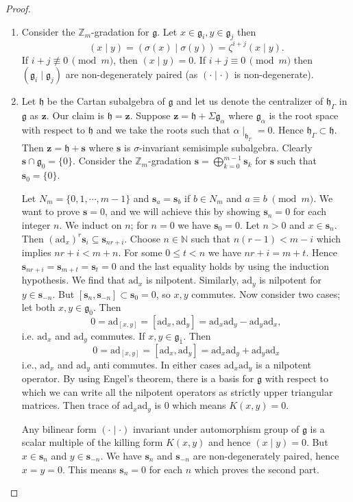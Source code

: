 \documentclass[11pt]{amsart}
\theoremstyle{plain}
\theoremstyle{definition}
\newcommand{\g}{\mathfrak{g}}
\newcommand{\h}{\mathfrak{h}}
\begin{document}
\begin{proof}
\begin{enumerate}[label=(\alph*)]
\item 
Consider the $\mathbb{Z}_{m}$-gradation for $\g$. Let  $x\in\g_{i}, y \in \g_{j}$ then 
 \[(x \mid y)=(\sigma(x) \mid \sigma(y))=\zeta^{i+j}(x \mid y).\]
 If $i+j \not\equiv 0\, {\pmod m}$, then $(x \mid y)=0$. If $i+j \equiv 0\, {\pmod m}$ then $(\g_{i} \mid \g_{j})$ are non-degenerately paired
 (as $(\cdot \mid \cdot)$ is non-degenerate).
 \item
Let $\h$ be the Cartan subalgebra of $\g$ and let us denote the centralizer of $\h_{\Gamma}$ in $\g$ as $\textbf{z}$. Our claim is $\h=\textbf{z}.$ Suppose $\textbf{z}=\h +\Sigma \g_{\alpha}$ where $\g_{\alpha}$ is the root space with respect to $\h$ and we take the roots such that $\alpha \mid_{\h_{\Gamma}}=0$. Hence $\h_{\Gamma} \subset \h$. Then $\textbf{z}=\h + \textbf{s}$ where $\textbf{s}$ is $\sigma$-invariant semisimple subalgebra. Clearly $\textbf{s} \cap \g_{0}=\{0\}$. Consider the $\mathbb{Z}_{m}$-gradation  $ \textbf{s}=\bigoplus_{k=0}^{m-1}\textbf{s}_{k}$ for $\textbf{s}$ such that $\textbf{s}_{0}=\{0\}$.

Let $N_{m}=\{0, 1, \cdots, m-1\}$ and $\textbf{s}_{a}=\textbf{s}_{b}$ if $b \in N_{m}$ and $a \equiv b\; {\pmod m}$. We want to prove $\textbf{s}=0$, and we will achieve this by showing $\textbf{s}_{n}=0$ for each integer $n$. We induct on $n$; for $n=0$ we have $\textbf{s}_{0}=0$. Let $n>0$ and $x \in \textbf{s}_{n}$. Then $(\mathrm{ad}_x)^{r} \textbf{s}_{i} \subseteq \textbf{s}_{nr+i}$. Choose $n \in \mathbb{N}$ such that $n(r-1) < m-i$ which implies $n r+i < m+n$. For some $0 \leq t <n$ we have $n r+i=m+t$. Hence $\textbf{s}_{n r+i}=\textbf{s}_{m+t}=\textbf{s}_{t}=0$ and the last equality holds by using the induction hypothesis. We find that $\mathrm{ad}_{x}$ is nilpotent. Similarly, $\mathrm{ad}_{y}$ is nilpotent for $y \in \textbf{s}_{-n}.$ But $[\textbf{s}_{n}, \textbf{s}_{-n}]\subset \textbf{s}_{0}=0$, so $x, y$ commutes. Now consider two cases; let both $x, y \in \g_{\bar{0}}$. Then \[0=\mathrm{ad}_{[x, y]}=[\mathrm{ad}_{x}, \mathrm{ad}_{y}]=\mathrm{ad}_{x} \mathrm{ad}_{y}-\mathrm{ad}_{y} \mathrm{ad}_{x},\] i.e. $\mathrm{ad}_{x}$ and $\mathrm{ad}_{y}$ commutes. If  $x, y \in \g_{\bar{1}}$. Then
\[ 0=\mathrm{ad}_{[x, y]}=[\mathrm{ad}_{x}, \mathrm{ad}_{y}]=\mathrm{ad}_{x} \mathrm{ad}_{y}+\mathrm{ad}_{y} \mathrm{ad}_{x}\] i.e., $\mathrm{ad}_{x}$ and $\mathrm{ad}_{y}$ anti commutes. In either cases $\mathrm{ad}_{x} \mathrm{ad}_{y}$ is a nilpotent operator. By using Engel's theorem, there is a basis for $\g$ with respect to which we can write all the nilpotent operators as strictly upper triangular matrices. Then trace of $\mathrm{ad}_{x} \mathrm{ad}_{y}$ is $0$ which means $K(x, y)=0$.
  
Any bilinear form $(\cdot \mid \cdot)$ invariant under automorphism group of $\g$ is a scalar multiple of the killing form $K(x, y)$ and hence $(x\mid y)=0$. But $x\in \textbf{s}_{n}$ and $y\in \textbf{s}_{-n}$. We have $\textbf{s}_{n}$ and $\textbf{s}_{-n}$ are non-degenerately paired, hence $x=y=0$. This means $\textbf{s}_{n}=0$ for each $n$ which proves the second part.
\end{enumerate}
\end{proof}
\end{document}
